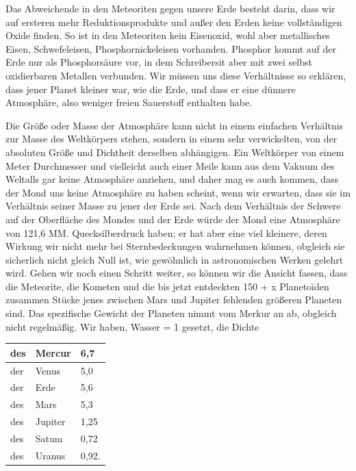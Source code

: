 \documentclass[a4paper, 11pt, oneside, german]{article}
\begin{document}
Das Abweichende in den Meteoriten gegen unsere Erde besteht darin, dass wir auf ersteren mehr Reduktionsprodukte und außer den Erden keine vollständigen Oxide finden. So ist in den Meteoriten kein Eisenoxid, wohl aber metallisches Eisen, Schwefeleisen, Phosphornickeleisen vorhanden. Phosphor kommt auf der Erde nur als Phosphorsäure vor, in dem Schreibersit aber mit zwei selbst oxidierbaren Metallen verbunden. Wir müssen uns diese Verhältnisse so erklären, dass jener Planet kleiner war, wie die Erde, und dass er eine dünnere Atmosphäre, also weniger freien Sauerstoff enthalten habe.

Die Größe oder Masse der Atmosphäre kann nicht in einem einfachen Verhältnis zur Masse des Weltkörpers stehen, sondern in einem sehr verwickelten, von der absoluten Größe und Dichtheit derselben abhängigen. Ein Weltkörper von einem Meter Durchmesser und vielleicht auch einer Meile kann aus dem Vakuum des Weltalls gar keine Atmosphäre anziehen, und daher mag es auch kommen, dass der Mond uns keine Atmosphäre zu haben scheint, wenn wir erwarten, dass sie im Verhältnis seiner Masse zu jener der Erde sei. Nach dem Verhältnis der Schwere auf der Oberfläche des Mondes und der Erde würde der Mond eine Atmosphäre von 121,6 MM. Quecksilberdruck haben; er hat aber eine viel kleinere, deren Wirkung wir nicht mehr bei Sternbedeckungen wahrnehmen können, obgleich sie sicherlich nicht gleich Null ist, wie gewöhnlich in astronomischen Werken gelehrt wird. Gehen wir noch einen Schritt weiter, so können wir die Ansicht fassen, dass die Meteorite, die Kometen und die bis jetzt entdeckten 150 + x Planetoïden zusammen Stücke jenes zwischen Mars und Jupiter fehlenden größeren Planeten sind. Das spezifische Gewicht der Planeten nimmt vom Merkur an ab, obgleich nicht regelmäßig. Wir haben, Wasser = 1 gesetzt, die Dichte
\begin{table}[H]
    \centering
    \begin{tabular}{|l|l|l|}
    \hline
        des & Mercur & 6,7 \\ \hline
        der & Venus & 5,0 \\ \hline
        der & Erde & 5,6 \\ \hline
        des & Mars & 5,3 \\ \hline
        des & Jupiter & 1,25 \\ \hline
        des & Satum & 0,72 \\ \hline
        des & Uranus & 0,92. \\ \hline
    \end{tabular}
\end{table}
\end{document}
